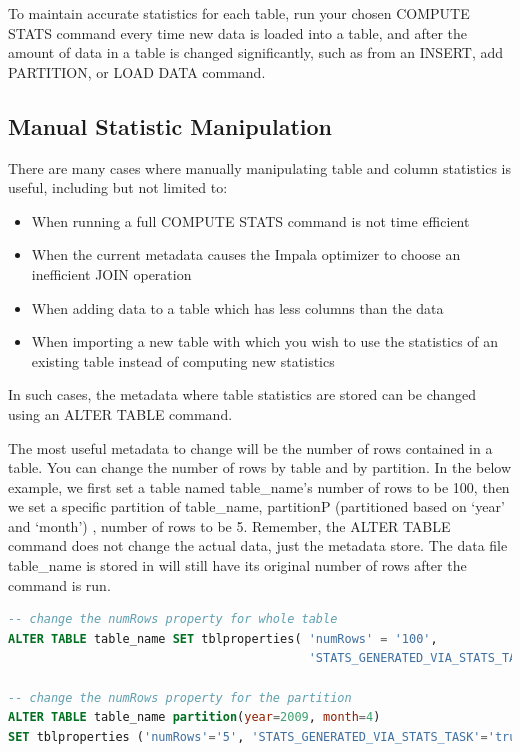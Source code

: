\documentclass[onecolumn, draftclsnofoot,10pt, compsoc]{IEEEtran}
\begin{document}
To maintain accurate statistics for each table, run your chosen COMPUTE STATS command every time new data is loaded into a table, and after the amount of data in a table is changed significantly, such as from an INSERT, add PARTITION, or LOAD DATA command. 

\subsection{Manual Statistic Manipulation}
There are many cases where manually manipulating table and column statistics is useful, including but not limited to:
\begin{itemize}
    \item When running a full COMPUTE STATS command is not time efficient
    \item When the current metadata causes the Impala optimizer to choose an inefficient JOIN operation
    \item When adding data to a table which has less columns than the data 
    \item When importing a new table with which you wish to use the statistics of an existing table instead of computing new statistics
\end{itemize}

In such cases, the metadata where table statistics are stored can be changed using an ALTER TABLE command. 

The most useful metadata to change will be the number of rows contained in a table. 
You can change the number of rows by table and by partition.
In the below example, we first set a table named table\_name’s number of rows to be 100, then we set a specific partition of table\_name, partitionP (partitioned based on ‘year’ and ‘month’) , number of rows to be 5. 
Remember, the ALTER TABLE command does not change the actual data,  just the metadata store. 
The data file table\_name is stored in will still have its original number of rows after the command is run.

    \begin{center}
    \begin{lstlisting}[language=SQL]
-- change the numRows property for whole table
ALTER TABLE table_name SET tblproperties( 'numRows' = '100', 
                                          'STATS_GENERATED_VIA_STATS_TASK'='true');
                                           
-- change the numRows property for the partition
ALTER TABLE table_name partition(year=2009, month=4)
SET tblproperties ('numRows'='5', 'STATS_GENERATED_VIA_STATS_TASK'='true'); 
\end{lstlisting}
\end{center}
\end{document}
